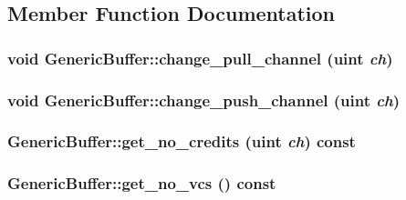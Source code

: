 \subsection{Member Function Documentation}
\hypertarget{classGenericBuffer_6d7fe4a638dc7eb0358c3490bf8d2cf4}{
\subsubsection[{change\_\-pull\_\-channel}]{\setlength{\rightskip}{0pt plus 5cm}void GenericBuffer::change\_\-pull\_\-channel ({\bf uint} {\em ch})}}
\label{classGenericBuffer_6d7fe4a638dc7eb0358c3490bf8d2cf4}


\hypertarget{classGenericBuffer_31e2c8b678d219fcc5d6e351f2f8623c}{
\subsubsection[{change\_\-push\_\-channel}]{\setlength{\rightskip}{0pt plus 5cm}void GenericBuffer::change\_\-push\_\-channel ({\bf uint} {\em ch})}}
\label{classGenericBuffer_31e2c8b678d219fcc5d6e351f2f8623c}


\hypertarget{classGenericBuffer_8c80e28741bae248ed61c72cc5399f2d}{
\subsubsection[{get\_\-no\_\-credits}]{ GenericBuffer::get\_\-no\_\-credits ({\bf uint} {\em ch}) const}}
\label{classGenericBuffer_8c80e28741bae248ed61c72cc5399f2d}


\hypertarget{classGenericBuffer_528c7b73ffbb3870cab0fc999a01a024}{
\subsubsection[{get\_\-no\_\-vcs}]{ GenericBuffer::get\_\-no\_\-vcs () const}}
\label{classGenericBuffer_528c7b73ffbb3870cab0fc999a01a024}


